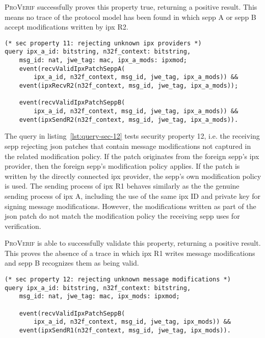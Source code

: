 \textsc{ProVerif} successfully proves this property true, returning a positive result.
This means no trace of the protocol model has been found in which \gls{sepp} A or \gls{sepp} B accept modifications written by \gls{ipx} R2.

\begin{lstlisting}[caption={Query for security property 11},label={lst:query-sec-11},firstnumber=375]
(* sec property 11: rejecting unknown ipx providers *)
query ipx_a_id: bitstring, n32f_context: bitstring,
    msg_id: nat, jwe_tag: mac, ipx_a_mods: ipxmod;
    event(recvValidIpxPatchSeppA(
        ipx_a_id, n32f_context, msg_id, jwe_tag, ipx_a_mods)) &&
    event(ipxRecvR2(n32f_context, msg_id, jwe_tag, ipx_a_mods));

    event(recvValidIpxPatchSeppB(
        ipx_a_id, n32f_context, msg_id, jwe_tag, ipx_a_mods)) &&
    event(ipxSendR2(n32f_context, msg_id, jwe_tag, ipx_a_mods)).
\end{lstlisting}

The query in listing~\ref{lst:query-sec-12} tests security property 12, i.e. the receiving \gls{sepp} rejecting \gls{json} patches that contain message modifications not captured in the related modification policy.
If the patch originates from the foreign \gls{sepp}'s \gls{ipx} provider, then the foreign \gls{sepp}'s modification policy applies.
If the patch is written by the directly connected \gls{ipx} provider, the \gls{sepp}'s own modification policy is used.
The sending process of \gls{ipx} R1 behaves similarly as the the genuine sending process of \gls{ipx} A, including the use of the same \gls{ipx} ID and private key for signing message modifications.
However, the modifications written as part of the \gls{json} patch do not match the modification policy the receiving \gls{sepp} uses for verification.

\textsc{ProVerif} is able to successfully validate this property, returning a positive result.
This proves the absence of a trace in which \gls{ipx} R1 writes message modifications and \gls{sepp} B recognizes them as being valid.

\begin{lstlisting}[caption={Query for security property 12},label={lst:query-sec-12},firstnumber=386]
(* sec property 12: rejecting unknown message modifications *)
query ipx_a_id: bitstring, n32f_context: bitstring,
    msg_id: nat, jwe_tag: mac, ipx_mods: ipxmod;

    event(recvValidIpxPatchSeppB(
        ipx_a_id, n32f_context, msg_id, jwe_tag, ipx_mods)) &&
    event(ipxSendR1(n32f_context, msg_id, jwe_tag, ipx_mods)).
\end{lstlisting}

